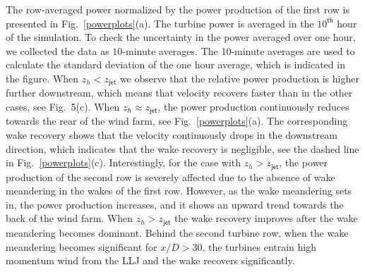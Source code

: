 \documentclass[%
 aip,
 amsmath,amssymb,
preprint,%
author-numerical,%
]{revtex4-1}
\begin{document}
The row-averaged power normalized by the power production of the first row is presented in Fig.\ \ref{powerplots}(a). The turbine power is averaged in the $10^\mathsf{th}$ hour of the simulation. To check the uncertainty in the power averaged over one hour, we collected the data as $10$-minute averages. The 10-minute averages are used to calculate the standard deviation of the one hour average, which is indicated in the figure. When $z_h < z_\mathsf{jet}$ we observe that the relative power production is higher further downstream, which means that velocity recovers faster than in the other cases, see Fig.\ 5(c). When $z_h \approx z_\mathsf{jet}$, the power production continuously reduces towards the rear of the wind farm, see Fig.\ \ref{powerplots}(a). The corresponding wake recovery shows that the velocity continuously drops in the downstream direction, which indicates that the wake recovery is negligible, see the dashed line in Fig.\ \ref{powerplots}(c). Interestingly, for the case with $z_h > z_\mathsf{jet}$, the power production of the second row is severely affected due to the absence of wake meandering in the wakes of the first row. However, as the wake meandering sets in, the power production increases, and it shows an upward trend towards the back of the wind farm. When $z_h > z_\mathsf{jet}$ the wake recovery improves after the wake meandering becomes dominant. Behind the second turbine row, when the wake meandering becomes significant for $x/D > 30$, the turbines entrain high momentum wind from the LLJ and the wake recovers significantly.

\end{document}

